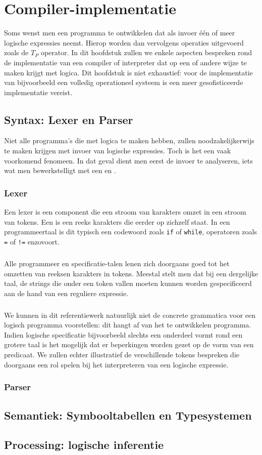 \chapter{Compiler-implementatie}
Soms wenst men een programma te ontwikkelen dat als invoer \'e\'en of meer logische expressies neemt. Hierop worden dan vervolgens operaties uitgevoerd zoals de $T_P$ operator. In dit hoofdstuk zullen we enkele aspecten bespreken rond de implementatie van een compiler of interpreter dat op een of andere wijze te maken krijgt met logica. Dit hoofdstuk is niet exhaustief: voor de implementatie van bijvoorbeeld een volledig operationeel \prolog{} systeem is een meer gesofisticeerde implementatie vereist.
\section{Syntax: Lexer en Parser}
Niet alle programma's die met logica te maken hebben, zullen noodzakelijkerwijs te maken krijgen met invoer van logische expressies. Toch is het een vaak voorkomend fenomeen. In dat geval dient men eerst de invoer te analyseren, iets wat men bewerkstelligt met een  en .
\subsection{Lexer}
Een lexer is een component die een stroom van karakters omzet in een stroom van tokens. Een  is een reeks karakters die eerder op zichzelf staat. In een programmeertaal is dit typisch een codewoord zoals \verb+if+ of \verb+while+, operatoren zoals \verb+=+ of \verb+!=+ enzovoort.
\paragraph{}
Alle programmeer en specificatie-talen lenen zich doorgaans goed tot het omzetten van reeksen karakters in tokens. Meestal stelt men dat bij een dergelijke taal, de strings die onder een token vallen moeten kunnen worden gespecificeerd aan de hand van een reguliere expressie.
\paragraph{}
We kunnen in dit referentiewerk natuurlijk niet de concrete grammatica voor een logisch programma voorstellen: dit hangt af van het te ontwikkelen programma. Indien logische specificatie bijvoorbeeld slechts een onderdeel vormt rond een grotere taal is het mogelijk dat er beperkingen worden gezet op de vorm van een predicaat. We zullen echter illustratief de verschillende tokens bespreken die doorgaans een rol spelen bij het interpreteren van een logische expressie.
\subsection{Parser}
\section{Semantiek: Symbooltabellen en Typesystemen}
\section{Processing: logische inferentie}